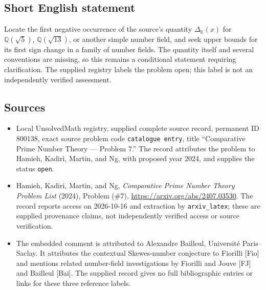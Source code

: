 \documentclass[11pt]{article}
\newcommand{\Q}{\mathbb{Q}}
\begin{document}
\subsection{Short English statement}
Locate the first negative occurrence of the source's quantity \(\Delta_{\mathbb K}(x)\) for \(\Q(\sqrt{5})\), \(\Q(\sqrt{13})\), or another simple number field, and seek upper bounds for its first sign change in a family of number fields. The quantity itself and several conventions are missing, so this remains a conditional statement requiring clarification. The supplied registry labels the problem open; this label is not an independently verified assessment.
\subsection{Sources}
\begin{itemize}
\item Local UnsolvedMath registry, supplied complete source record, permanent ID \(800138\), exact source problem code \texttt{catalogue entry}, title ``Comparative Prime Number Theory --- Problem 7.'' The record attributes the problem to Hamieh, Kadiri, Martin, and Ng, with proposed year 2024, and supplies the status \texttt{open}.
\item Hamieh, Kadiri, Martin, and Ng, \emph{Comparative Prime Number Theory Problem List} (2024), Problem (\#7), \url{https://arxiv.org/abs/2407.03530}. The record reports access on 2026-10-16 and extraction by \texttt{arxiv\_latex}; these are supplied provenance claims, not independently verified access or source verification.
\item The embedded comment is attributed to Alexandre Bailleul, Universit\'e Paris--Saclay. It attributes the contextual Skewes-number conjecture to Fiorilli [Fio] and mentions related number-field investigations by Fiorilli and Jouve [FJ] and Bailleul [Bai]. The supplied record gives no full bibliographic entries or links for these three reference labels.
\end{itemize}
\end{document}
